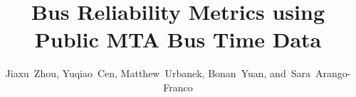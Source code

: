 \documentclass[12pt,journal,compsoc]{IEEEtran}
\begin{document}
%
\title{Bus Reliability Metrics using Public MTA Bus Time Data}
%
%
%
%

\author{Jiaxu~Zhou,
        Yuqiao~Cen,
        Matthew~Urbanek,
        Bonan~Yuan,
        and~Sara~Arango-Franco}%

% 
%
\end{document}
